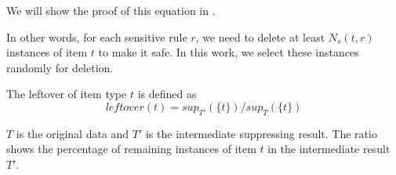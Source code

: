 We will show the proof of this equation in . 

In other words, for each sensitive rule $r$,
we need to delete at least $N_s(t, r)$ instances of item $t$ to make it safe.
In this work, we select these instances randomly for deletion.

\begin{definition}
 The leftover of item type $t$ is defined as
\begin{equation}
leftover(t)={sup_{T'}(\{t\})}/{sup_T(\{t\})}
\end{equation}
\end{definition}
$T$ is the original data and $T'$ is the intermediate suppressing result.
The ratio shows the percentage of remaining instances of item $t$
in the intermediate result $T'$.


